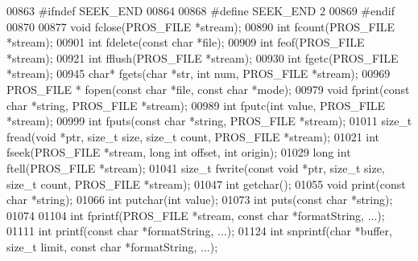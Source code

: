 \begin{DoxyCode}
00863 \textcolor{preprocessor}{#ifndef SEEK\_END}
00864 
00868 \textcolor{preprocessor}{#define SEEK\_END 2}
00869 \textcolor{preprocessor}{#endif}
00870 
00877 \textcolor{keywordtype}{void} fclose(PROS\_FILE *stream);
00890 \textcolor{keywordtype}{int} fcount(PROS\_FILE *stream);
00901 \textcolor{keywordtype}{int} fdelete(\textcolor{keyword}{const} \textcolor{keywordtype}{char} *file);
00909 \textcolor{keywordtype}{int} feof(PROS\_FILE *stream);
00921 \textcolor{keywordtype}{int} fflush(PROS\_FILE *stream);
00930 \textcolor{keywordtype}{int} fgetc(PROS\_FILE *stream);
00945 \textcolor{keywordtype}{char}* fgets(\textcolor{keywordtype}{char} *str, \textcolor{keywordtype}{int} num, PROS\_FILE *stream);
00969 PROS\_FILE * fopen(\textcolor{keyword}{const} \textcolor{keywordtype}{char} *file, \textcolor{keyword}{const} \textcolor{keywordtype}{char} *mode);
00979 \textcolor{keywordtype}{void} fprint(\textcolor{keyword}{const} \textcolor{keywordtype}{char} *\textcolor{keywordtype}{string}, PROS\_FILE *stream);
00989 \textcolor{keywordtype}{int} fputc(\textcolor{keywordtype}{int} value, PROS\_FILE *stream);
00999 \textcolor{keywordtype}{int} fputs(\textcolor{keyword}{const} \textcolor{keywordtype}{char} *\textcolor{keywordtype}{string}, PROS\_FILE *stream);
01011 \textcolor{keywordtype}{size\_t} fread(\textcolor{keywordtype}{void} *ptr, \textcolor{keywordtype}{size\_t} size, \textcolor{keywordtype}{size\_t} count, PROS\_FILE *stream);
01021 \textcolor{keywordtype}{int} fseek(PROS\_FILE *stream, \textcolor{keywordtype}{long} \textcolor{keywordtype}{int} offset, \textcolor{keywordtype}{int} origin);
01029 \textcolor{keywordtype}{long} \textcolor{keywordtype}{int} ftell(PROS\_FILE *stream);
01041 \textcolor{keywordtype}{size\_t} fwrite(\textcolor{keyword}{const} \textcolor{keywordtype}{void} *ptr, \textcolor{keywordtype}{size\_t} size, \textcolor{keywordtype}{size\_t} count, PROS\_FILE *stream);
01047 \textcolor{keywordtype}{int} getchar();
01055 \textcolor{keywordtype}{void} print(\textcolor{keyword}{const} \textcolor{keywordtype}{char} *\textcolor{keywordtype}{string});
01066 \textcolor{keywordtype}{int} putchar(\textcolor{keywordtype}{int} value);
01073 \textcolor{keywordtype}{int} puts(\textcolor{keyword}{const} \textcolor{keywordtype}{char} *\textcolor{keywordtype}{string});
01074 
01104 \textcolor{keywordtype}{int} fprintf(PROS\_FILE *stream, \textcolor{keyword}{const} \textcolor{keywordtype}{char} *formatString, ...);
01111 \textcolor{keywordtype}{int} printf(\textcolor{keyword}{const} \textcolor{keywordtype}{char} *formatString, ...);
01124 \textcolor{keywordtype}{int} snprintf(\textcolor{keywordtype}{char} *buffer, \textcolor{keywordtype}{size\_t} limit, \textcolor{keyword}{const} \textcolor{keywordtype}{char} *formatString, ...);

\end{DoxyCode}
